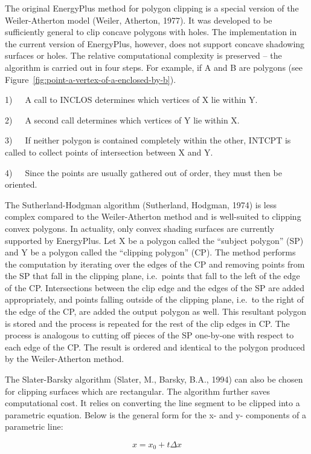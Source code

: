 The original EnergyPlus method for polygon clipping is a special version of the Weiler-Atherton model (Weiler, Atherton, 1977). It was developed to be sufficiently general to clip concave polygons with holes. The implementation in the current version of EnergyPlus, however, does not support concave shadowing surfaces or holes. The relative computational complexity is preserved -- the algorithm is carried out in four steps. For example, if A and B are polygons (see Figure~\ref{fig:point-a-vertex-of-a-enclosed-by-b}).

1)~~~A call to INCLOS determines which vertices of X lie within Y.

2)~~~A second call determines which vertices of Y lie within X.

3)~~~If neither polygon is contained completely within the other, INTCPT is called to collect points of intersection between X and Y.

4)~~~Since the points are usually gathered out of order, they must then be oriented.

The Sutherland-Hodgman algorithm (Sutherland, Hodgman, 1974) is less complex compared to the Weiler-Atherton method and is well-suited to clipping convex polygons. In actuality, only convex shading surfaces are currently supported by EnergyPlus. Let X be a polygon called the ``subject polygon'' (SP) and Y be a polygon called the ``clipping polygon'' (CP). The method performs the computation by iterating over the edges of the CP and removing points from the SP that fall in the clipping plane, i.e.~points that fall to the left of the edge of the CP. Intersections between the clip edge and the edges of the SP are added appropriately, and points falling outside of the clipping plane, i.e.~to the right of the edge of the CP, are added the output polygon as well. This resultant polygon is stored and the process is repeated for the rest of the clip edges in CP. The process is analogous to cutting off pieces of the SP one-by-one with respect to each edge of the CP. The result is ordered and identical to the polygon produced by the Weiler-Atherton method.

The Slater-Barsky algorithm (Slater, M., Barsky, B.A., 1994) can also be chosen for clipping surfaces which are rectangular. The algorithm further saves computational cost. It relies on converting the line segment to be clipped into a parametric equation. Below is the general form for the x- and y- components of a parametric line:

\begin{equation}
x = x_0 + t \Delta x
\end{equation}


